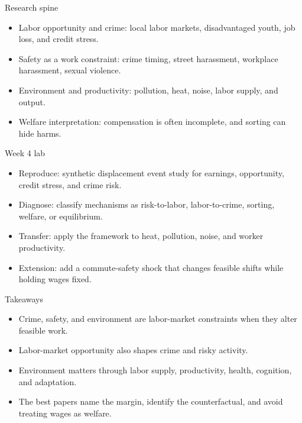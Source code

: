 \documentclass[aspectratio=169,11pt]{beamer}
\begin{document}
\begin{frame}{Research spine}
\begin{itemize}
    \item Labor opportunity and crime: local labor markets, disadvantaged youth, job loss, and credit stress.
    \item Safety as a work constraint: crime timing, street harassment, workplace harassment, sexual violence.
    \item Environment and productivity: pollution, heat, noise, labor supply, and output.
    \item Welfare interpretation: compensation is often incomplete, and sorting can hide harms.
\end{itemize}
\end{frame}

\begin{frame}{Week 4 lab}
\begin{itemize}
    \item Reproduce: synthetic displacement event study for earnings, opportunity, credit stress, and crime risk.
    \item Diagnose: classify mechanisms as risk-to-labor, labor-to-crime, sorting, welfare, or equilibrium.
    \item Transfer: apply the framework to heat, pollution, noise, and worker productivity.
    \item Extension: add a commute-safety shock that changes feasible shifts while holding wages fixed.
\end{itemize}
\end{frame}

\begin{frame}{Takeaways}
\begin{itemize}
    \item Crime, safety, and environment are labor-market constraints when they alter feasible work.
    \item Labor-market opportunity also shapes crime and risky activity.
    \item Environment matters through labor supply, productivity, health, cognition, and adaptation.
    \item The best papers name the margin, identify the counterfactual, and avoid treating wages as welfare.
\end{itemize}
\end{frame}
\end{document}
